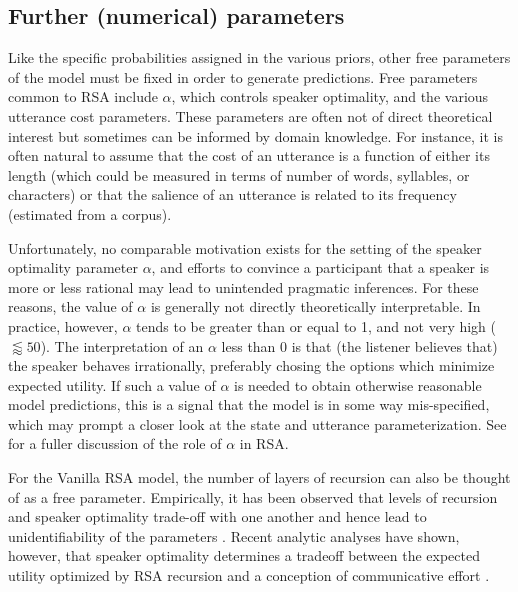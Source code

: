 \documentclass[10pt,letterpaper]{article}
\newcommand{\mht}[1]{\textcolor{purple}{[mht: #1]}}
\begin{document}

%


\subsection*{Further (numerical) parameters}

Like the specific probabilities assigned in the various priors, other free parameters of the model must be fixed in order to generate predictions. Free parameters common to RSA include $\alpha$, which controls speaker optimality, and the various utterance cost parameters. These parameters are often not of direct theoretical interest but sometimes can be informed by domain knowledge. For instance, it is often natural to assume that the cost of an utterance is a function of either its length  (which could be measured in terms of number of words, syllables, or characters) or that the salience of an utterance is related to its frequency (estimated from a corpus).

Unfortunately,  no comparable motivation exists for the setting of the speaker optimality parameter $\alpha$, and efforts to convince a participant that a speaker is more or less rational may lead to unintended pragmatic inferences. For these reasons, the value of $\alpha$ is generally not directly theoretically interpretable. In practice, however, $\alpha$ tends to be greater than or equal to 1, and not very high ($\lessapprox 50$). The interpretation of an $\alpha$ less than 0 is that (the listener believes that) the speaker behaves irrationally, preferably chosing the options which minimize expected utility. If such a value of $\alpha$ is needed to obtain otherwise reasonable model predictions, this is a signal that the model is in some way mis-specified, which may prompt a closer look at the state and utterance parameterization.  See \cite{zaslavsky2020rate} for a fuller discussion of the role of $\alpha$ in RSA.

For the Vanilla RSA model, the number of layers of recursion can also be thought of as a free parameter. Empirically, it has been observed that levels of recursion and speaker optimality trade-off with one another  and hence lead to unidentifiability of the parameters \cite{frank2016rational}. Recent analytic analyses have shown, however, that speaker optimality determines a tradeoff between the expected utility optimized by RSA recursion and a conception of communicative effort \cite{zaslavsky2020rate}.
\end{document}
